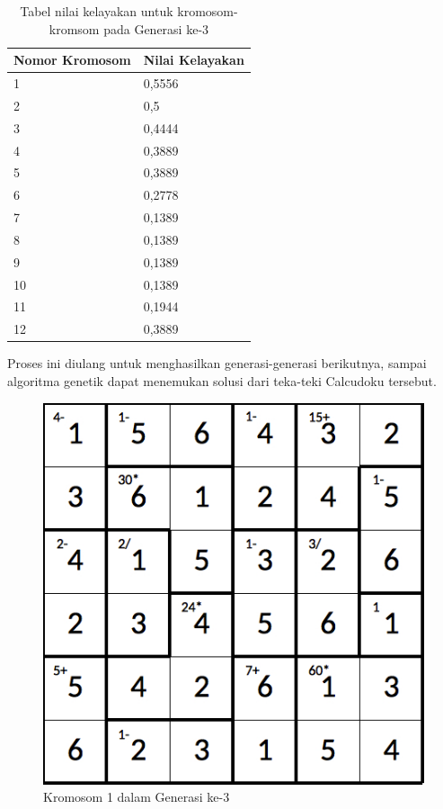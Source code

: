 \begin{table}
\centering
\captionsetup{justification=centering}
\caption[Tabel nilai kelayakan untuk kromosom-kromsom pada Generasi ke-3]{Tabel nilai kelayakan untuk kromosom-kromsom pada Generasi ke-3}
\begin{tabular}{| l | l |}
\hline
Nomor Kromosom & Nilai Kelayakan \\
\hline \hline
1 & 0,5556 \\
\hline
2 & 0,5 \\
\hline
3 & 0,4444 \\
\hline
4 & 0,3889 \\
\hline
5 & 0,3889 \\
\hline
6 & 0,2778 \\
\hline
7 & 0,1389 \\
\hline
8 & 0,1389 \\
\hline
9 & 0,1389 \\
\hline
10 & 0,1389 \\
\hline
11 & 0,1944 \\
\hline
12 & 0,3889 \\
\hline
\end{tabular}
\label{tab:analisishg4}
\end{table}

Proses ini diulang untuk menghasilkan generasi-generasi berikutnya, sampai algoritma genetik dapat menemukan solusi dari teka-teki Calcudoku tersebut.

\clearpage

\begin{figure}
\centering
\captionsetup{justification=centering}
\includegraphics[scale=0.333]{Gambar/hybridgenetic/Generation3Chromosome1}
\caption[Kromosom 1 dalam Generasi ke-3]{Kromosom 1 dalam Generasi ke-3}
\label{fig:analisisg3k1}
\end{figure}


